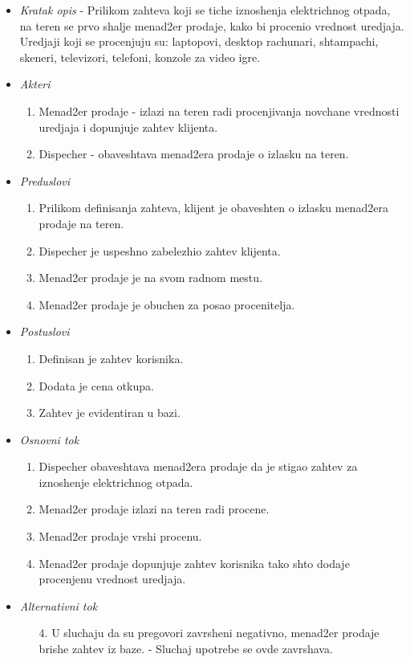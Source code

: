 \documentclass[10 pt]{article}
\begin{document}
		\begin{itemize}

			\item\textit{Kratak opis} - Prilikom zahteva koji se tiche iznoshenja elektrichnog otpada, na teren se prvo shalje menad2er prodaje,
			kako bi procenio vrednost uredjaja. Uredjaji koji se procenjuju su:
			laptopovi, desktop rachunari, shtampachi, skeneri, televizori, telefoni, konzole za video igre.
			
			\item\textit{Akteri}
				\begin{enumerate}
					\item Menad2er prodaje - izlazi na teren radi procenjivanja novchane vrednosti uredjaja i dopunjuje zahtev klijenta.
					\item Dispecher - obaveshtava menad2era prodaje o izlasku na teren.
				\end{enumerate}
			
			\item\textit{Preduslovi} 
				\begin{enumerate} 
					\item Prilikom definisanja zahteva, klijent je obaveshten o izlasku menad2era prodaje na teren.
					\item Dispecher je uspeshno zabelezhio zahtev klijenta.
					\item Menad2er prodaje je na svom radnom mestu.
					\item Menad2er prodaje je obuchen za posao procenitelja.
				\end{enumerate}			
			
			\item\textit{Postuslovi}
				\begin{enumerate}
					\item Definisan je zahtev korisnika. 
					\item Dodata je cena otkupa.
					\item Zahtev je evidentiran u bazi.
				\end{enumerate}
			
			\item\textit{Osnovni tok}
				\begin{enumerate} 
					\item Dispecher obaveshtava menad2era prodaje da je stigao zahtev za iznoshenje elektrichnog otpada.
					\item Menad2er prodaje izlazi na teren radi procene.
					\item Menad2er prodaje vrshi procenu.
					\item Menad2er prodaje dopunjuje zahtev korisnika tako shto dodaje procenjenu vrednost uredjaja.
				\end{enumerate}
			
			\item\textit{Alternativni tok}
				\begin{enumerate}
					\item [4.] U sluchaju da su pregovori zavrsheni negativno, menad2er prodaje brishe zahtev iz baze. - Sluchaj upotrebe se ovde zavrshava.
				\end{enumerate}
			
		\end{itemize}
	\newpage
	
\end{document}
